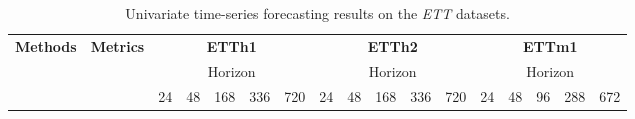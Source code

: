 \documentclass{article}
\begin{document}
\begin{table*}[htbp]
\caption{Univariate time-series forecasting results on the \emph{ETT} datasets.}
\resizebox{\textwidth}{!}
{
\begin{tabular}{c|c|c|c|c|c|c|c|c|c|c|c|c|c|c|c|c}
\hline
\multirow{3}{*}{\textbf{Methods}} & \multirow{3}{*}{\textbf{Metrics}} & \multicolumn{5}{c|}{\textbf{ETTh1}}                                                                              & \multicolumn{5}{c|}{\textbf{ETTh2}}                                                                              & \multicolumn{5}{c}{\textbf{ETTm1}}                                                                              \\ \cline{3-17} 
                                  &                                   & \multicolumn{5}{c|}{Horizon}                                                                                     & \multicolumn{5}{c|}{Horizon}                                                                                     & \multicolumn{5}{c}{Horizon}                                                                                     \\ \cline{3-17} 
                                  &                                   & 24                   & 48                   & 168                  & 336                  & 720                  & 24                   & 48                   & 168                  & 336                  & 720                  & 24                   & 48                   & 96                   & 288                  & 672                  \\ \hline


\end{tabular}}
\end{table*}
\end{document}
